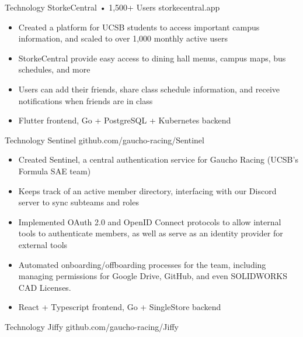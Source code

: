 \documentclass[9pt]{developercv} %
\begin{document}
\begin{entrylist}
    \entry
		{Technology}
		{StorkeCentral • 1,500+ Users}
		{storkecentral.app}
        {\vspace{-8pt}
        \begin{itemize}[noitemsep,topsep=0pt,parsep=0pt,partopsep=0pt, leftmargin=10pt]
            \item Created a platform for UCSB students to access important campus information, and scaled to over 1,000 monthly active users
            \item StorkeCentral provide easy access to dining hall menus, campus maps, bus schedules, and more
            \item Users can add their friends, share class schedule information, and receive notifications when friends are in class
            \item Flutter frontend, Go + PostgreSQL + Kubernetes backend
        \end{itemize}}
	\entry
		{Technology}
		{Sentinel}
		{github.com/gaucho-racing/Sentinel}
		{\vspace{-8pt}
        \begin{itemize}[noitemsep,topsep=0pt,parsep=0pt,partopsep=0pt, leftmargin=10pt]
            \item Created Sentinel, a central authentication service for Gaucho Racing (UCSB's Formula SAE team)
            \item Keeps track of an active member directory, interfacing with our Discord server to sync subteams and roles
            \item Implemented OAuth 2.0 and OpenID Connect protocols to allow internal tools to authenticate members, as well as serve as an identity provider for external tools
            \item Automated onboarding/offboarding processes for the team, including managing permissions for Google Drive, GitHub, and even SOLIDWORKS CAD Licenses.
            \item React + Typescript frontend, Go + SingleStore backend
        \end{itemize}}
    \entry
		{Technology}
		{Jiffy}
		{github.com/gaucho-racing/Jiffy}
		{\vspace{-8pt}
        \begin{itemize}[noitemsep,topsep=0pt,parsep=0pt,partopsep=0pt, leftmargin=10pt]

\end{itemize}}
\end{entrylist}
\end{document}
